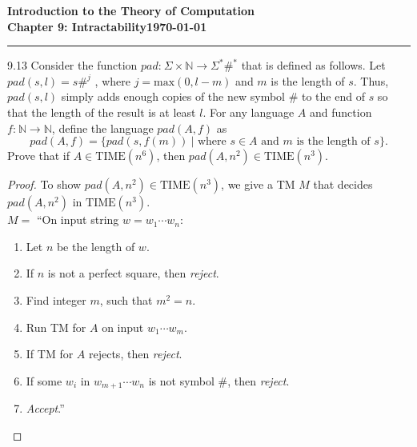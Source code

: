 \documentclass[11pt]{article}
\newcommand{\dated}{\today}
\begin{document}
\textbf{Introduction to the Theory of
Computation}\hfill\textbf{\myname}\\[0.01in]
\textbf{Chapter 9: Intractability}\hfill\textbf{\dated}\\
\smallskip\hrule\bigskip

\begin{problem}{9.13}
Consider the function $pad\text{:} \ \Sigma \times \mathbb{N} \longrightarrow \Sigma^*\#^*$ that is defined as follows. Let $pad(s, l) = s\#^j$ , where $j = \text{max}(0, l-m)$ and $m$ is the length of $s$. Thus, $pad(s, l)$ simply adds enough copies of the new symbol $\#$ to the end of $s$ so that the length of the result is at least $l$. For any language $A$ and function $f\text{:} \ \mathbb{N} \longrightarrow \mathbb{N}$, define the language $pad(A, f)$ as
\[
pad(A, f) = \{pad(s, f(m)) \ | \text{ where } s \in A \text{ and } m \text{ is the length of } s \}.
\]
Prove that if $A \in \text{TIME}(n^6)$, then $pad(A, n^2) \in \text{TIME}(n^3)$.
\end{problem}

\begin{proof}
To show $pad(A, n^2) \in \text{TIME}(n^3)$, we give a TM $M$ that decides $pad(A, n^2)$ in $\text{TIME}(n^3)$. \\

$M =$ \textquotedblleft On input string $w = w_1 \cdots w_n$:
\begin{enumerate}
\item Let $n$ be the length of $w$.
\item If $n$ is not a perfect square, then \textit{reject}.
\item Find integer $m$, such that $m^2 = n.$
\item Run TM for $A$ on input $w_1 \cdots w_m$.
\item If TM for $A$ rejects, then \textit{reject}.
\item If some $w_i$ in $w_{m+1} \cdots w_n$ is not symbol $\#$, then \textit{reject}.
\item \textit{Accept}.\textquotedblright
\end{enumerate}

\end{proof}
\end{document}
